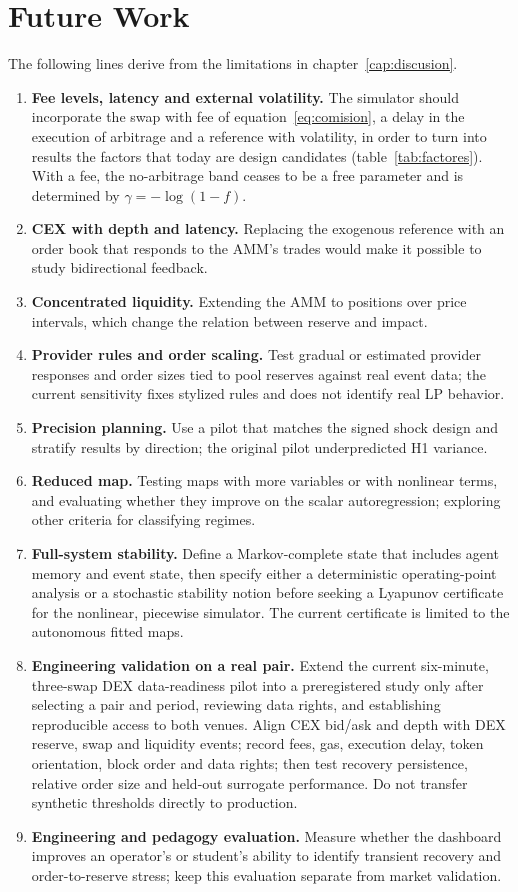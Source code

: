 \chapter{Future Work}
\label{cap:futuro}

The following lines derive from the limitations in chapter~\ref{cap:discusion}.

\begin{enumerate}
  \item \textbf{Fee levels, latency and external volatility.} The simulator should incorporate the swap with fee of equation~\eqref{eq:comision}, a delay in the execution of arbitrage and a reference with volatility, in order to turn into results the factors that today are design candidates (table~\ref{tab:factores}). With a fee, the no-arbitrage band ceases to be a free parameter and is determined by $\gamma=-\log(1-f)$.
  \item \textbf{CEX with depth and latency.} Replacing the exogenous reference with an order book that responds to the AMM's trades would make it possible to study bidirectional feedback.
  \item \textbf{Concentrated liquidity.} Extending the AMM to positions over price intervals, which change the relation between reserve and impact.
  \item \textbf{Provider rules and order scaling.} Test gradual or estimated provider responses and order sizes tied to pool reserves against real event data; the current sensitivity fixes stylized rules and does not identify real LP behavior.
  \item \textbf{Precision planning.} Use a pilot that matches the signed shock design and stratify results by direction; the original pilot underpredicted H1 variance.
  \item \textbf{Reduced map.} Testing maps with more variables or with nonlinear terms, and evaluating whether they improve on the scalar autoregression; exploring other criteria for classifying regimes.
  \item \textbf{Full-system stability.} Define a Markov-complete state that includes agent memory and event state, then specify either a deterministic operating-point analysis or a stochastic stability notion before seeking a Lyapunov certificate for the nonlinear, piecewise simulator. The current certificate is limited to the autonomous fitted maps.
  \item \textbf{Engineering validation on a real pair.} Extend the current six-minute, three-swap DEX data-readiness pilot into a preregistered study only after selecting a pair and period, reviewing data rights, and establishing reproducible access to both venues. Align CEX bid/ask and depth with DEX reserve, swap and liquidity events; record fees, gas, execution delay, token orientation, block order and data rights; then test recovery persistence, relative order size and held-out surrogate performance. Do not transfer synthetic thresholds directly to production.
  \item \textbf{Engineering and pedagogy evaluation.} Measure whether the dashboard improves an operator's or student's ability to identify transient recovery and order-to-reserve stress; keep this evaluation separate from market validation.
\end{enumerate}
